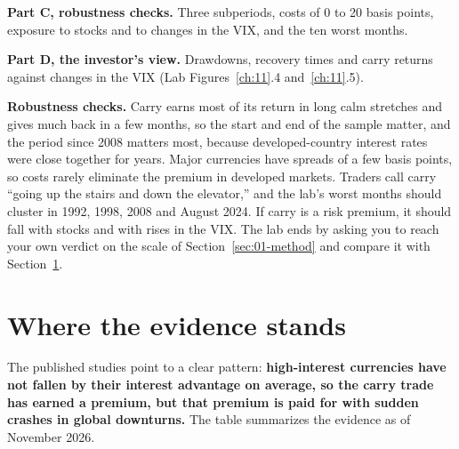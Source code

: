 \textbf{Part C, robustness checks.} Three subperiods, costs of 0 to 20 basis points, exposure to stocks and to changes in the VIX, and the ten worst months.

\textbf{Part D, the investor's view.} Drawdowns, recovery times and carry returns against changes in the VIX (Lab Figures~\ref{ch:11}.4 and~\ref{ch:11}.5).

\label{sec:06-stress}
\textbf{Robustness checks.} Carry earns most of its return in long calm stretches and gives much back in a few months, so the start and end of the sample matter, and the period since 2008 matters most, because developed-country interest rates were close together for years. Major currencies have spreads of a few basis points, so costs rarely eliminate the premium in developed markets. Traders call carry ``going up the stairs and down the elevator,'' and the lab's worst months should cluster in 1992, 1998, 2008 and August 2024. If carry is a risk premium, it should fall with stocks and with rises in the VIX. The lab ends by asking you to reach your own verdict on the scale of Section~\ref{sec:01-method} and compare it with Section~\ref{sec:06-verdict}.

\section{Where the evidence stands}
\label{sec:06-verdict}

The published studies point to a clear pattern: \textbf{high-interest currencies have not fallen by their interest advantage on average, so the carry trade has earned a premium, but that premium is paid for with sudden crashes in global downturns.} The table summarizes the evidence as of November 2026.

